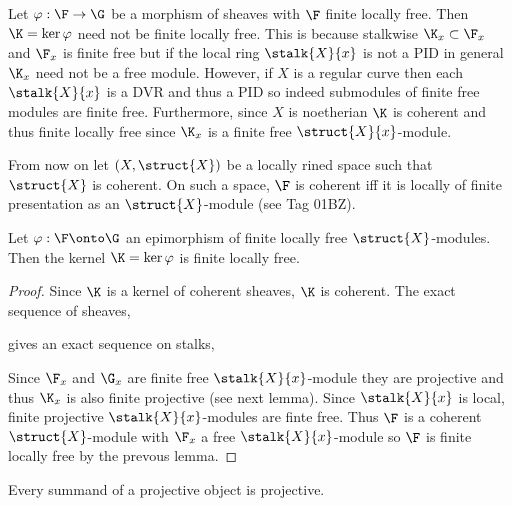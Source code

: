 \documentclass[12pt]{article}
\begin{document}
\begin{example}
Let $\varphi : \F \to \G$ be a morphism of sheaves with $\F$ finite locally free. Then $\K = \ker{\varphi}$ need not be finite locally free. This is because stalkwise $\K_x \subset \F_x$ and $\F_x$ is finite free but if the local ring $\stalk{X}{x}$ is not a PID in general $\K_x$ need not be a free module. However, if $X$ is a regular curve then each $\stalk{X}{x}$ is a DVR and thus a PID so indeed submodules of finite free modules are finite free. Furthermore, since $X$ is noetherian $\K$ is coherent and thus finite locally free since $\K_x$ is a finite free $\struct{X}{x}$-module.
\end{example}

\begin{rmk}
From now on let $(X, \struct{X})$ be a locally rined space such that $\struct{X}$ is coherent. On such a space, $\F$ is coherent iff it is locally of finite presentation as an $\struct{X}$-module (see Tag 01BZ).
\end{rmk}

\begin{prop}
Let $\varphi : \F \onto \G$ an epimorphism of finite locally free $\struct{X}$-modules. Then the kernel $\K = \ker{\varphi}$ is finite locally free.
\end{prop}

\begin{proof}
Since $\K$ is a kernel of coherent sheaves, $\K$ is coherent.
The exact sequence of sheaves,
\begin{center}
\end{center}
gives an exact sequence on stalks,
\begin{center}
\end{center}
Since $\F_x$ and $\G_x$ are finite free $\stalk{X}{x}$-module they are projective and thus $\K_x$ is also finite projective (see next lemma). Since $\stalk{X}{x}$ is local, finite projective $\stalk{X}{x}$-modules are finte free. Thus $\F$ is a coherent $\struct{X}$-module with $\F_x$ a free $\stalk{X}{x}$-module so $\F$ is finite locally free by the prevous lemma.
\end{proof}

\begin{lemma}
Every summand of a projective object is projective. 
\end{lemma}
\end{document}
